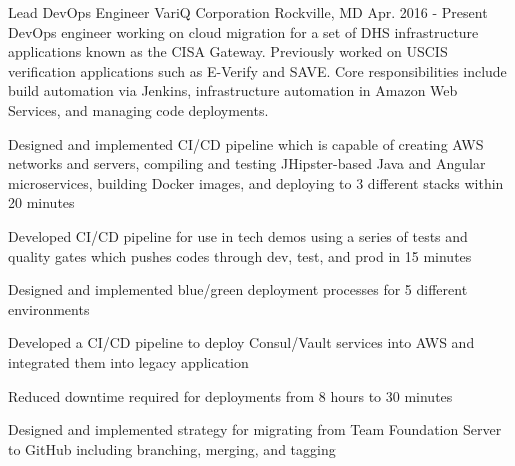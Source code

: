 

\begin{cventries}

  \cventry
    {Lead DevOps Engineer} %
    {VariQ Corporation} %
    {Rockville, MD} %
    {Apr. 2016 - Present} %
    {DevOps engineer working on cloud migration for a set of DHS infrastructure applications known as the CISA Gateway. Previously worked on USCIS verification applications such as E-Verify and SAVE. Core responsibilities include build automation via Jenkins, infrastructure automation in Amazon Web Services, and managing code deployments.} %
    {
      \begin{cvitems} %
        \item {Designed and implemented CI/CD pipeline which is capable of creating AWS networks and servers, compiling and testing JHipster-based Java and Angular microservices, building Docker images, and deploying to 3 different stacks within 20 minutes}
        \item {Developed CI/CD pipeline for use in tech demos using a series of tests and quality gates which pushes codes through dev, test, and prod in 15 minutes}
        \item {Designed and implemented blue/green deployment processes for 5 different environments}
        \item {Developed a CI/CD pipeline to deploy Consul/Vault services into AWS and integrated them into legacy application}
        \item {Reduced downtime required for deployments from 8 hours to 30 minutes}
        \item {Designed and implemented strategy for migrating from Team Foundation Server to GitHub including branching, merging, and tagging}

\end{cvitems}}
\end{cventries}
